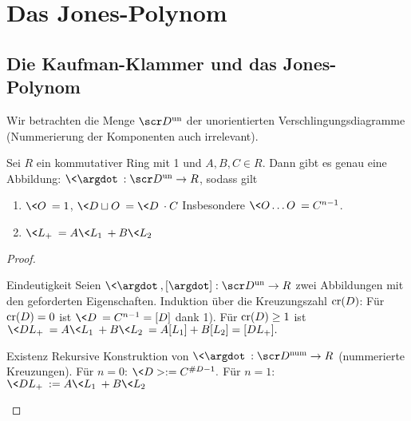 \chapter{Das Jones-Polynom}


\section{Die Kaufman-Klammer und das Jones-Polynom}


Wir betrachten die Menge $\scr D^{\text{un}}$ der unorientierten Verschlingungsdiagramme (Nummerierung der Komponenten auch irrelevant).

\begin{prop}
    Sei $R$ ein kommutativer Ring mit 1 und $A, B, C \in R$.
    Dann gibt es genau eine Abbildung: $\<\argdot\> : \scr D^{\text{un}} \to R$, sodass gilt
    \begin{enumerate}[1)]
        \item
            $\<O\> = 1$, $\<D \sqcup O\> = \< D \> \cdot C$
            Insbesondere $\<O \dotso O\> = C^{n-1}$.
        \item
            $\<L_+\> = A \< L_1 \> + B \< L_2 \>$
    \end{enumerate}
    \begin{proof}
        \begin{seg}{Eindeutigkeit}
            Seien $\<\argdot\>, [\argdot]: \scr D^{\text{un}} \to R$ zwei Abbildungen mit den geforderten Eigenschaften.
            Induktion über die Kreuzungszahl $\operatorname{cr}(D)$:
            Für $\operatorname{cr}(D) = 0$ ist $\<D\> = C^{n-1} = [D]$ dank 1).
            Für $\operatorname{cr}(D) \ge 1$ ist
            \begin{math}
                \< D L_+ \>
                = A \< L_1 \> + B \< L_2 \> 
                = A [ L_1 ] + B [ L_2 ]
                = [D L_+ ].
            \end{math}
        \end{seg}
        \begin{seg}{Existenz}
            Rekursive Konstruktion von $\<\argdot\>: \scr D^{\text{num}} \to R$ (nummerierte Kreuzungen).
            Für $n = 0$:
            \begin{math}
                \< D> := C^{\#D - 1}.
            \end{math}
            Für $n = 1$:
            \begin{math}
                \< D L_+ \> := A \< L_1 \> + B \< L_2 \>
            \end{math}

\end{seg}
\end{proof}
\end{prop}

